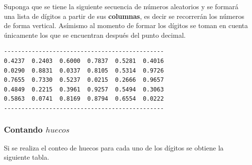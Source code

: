 Suponga que se tiene la siguiente secuencia de números aleatorios y se formará una lista de dígitos a partir de sus \textbf{columnas}, es decir se recorrerán los números de forma vertical. Asímismo al momento de formar los dígitos se toman en cuenta únicamente los que se encuentran después del punto decimal.

\begin{verbatim}
----------------------------------------------
0.4237  0.2403  0.6000  0.7837  0.5281  0.4016
0.0290  0.8831  0.0337  0.8105  0.5314  0.9726
0.7655  0.7330  0.5237  0.0215  0.2666  0.9657
0.4849  0.2215  0.3961  0.9257  0.5494  0.3063
0.5863  0.0741  0.8169  0.8794  0.6554  0.0222
----------------------------------------------

\end{verbatim}
\subsubsection{Contando $huecos$}
Si se realiza el conteo de huecos para cada uno de los dígitos se obtiene la siguiente tabla.

